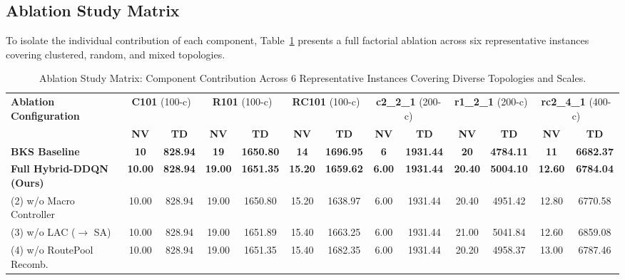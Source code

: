 \documentclass{ieeeaccess}
\begin{document}
\subsection{Ablation Study Matrix}
\label{sec:ablation_results}

To isolate the individual contribution of each component, Table~\ref{tab:ablation_matrix} presents a full factorial ablation across six representative instances covering clustered, random, and mixed topologies.

\begin{table}[!t]
\caption{Ablation Study Matrix: Component Contribution Across 6 Representative Instances Covering Diverse Topologies and Scales.}
\label{tab:ablation_matrix}
\centering
\footnotesize
\setlength{\tabcolsep}{2.5pt}
\begin{tabular*}{\textwidth}{@{\extracolsep{\fill}} l cc cc cc cc cc cc @{}}
\toprule
\multirow{2}{*}{\textbf{Ablation Configuration}} & \multicolumn{2}{c}{\textbf{C101} (100-c)} & \multicolumn{2}{c}{\textbf{R101} (100-c)} & \multicolumn{2}{c}{\textbf{RC101} (100-c)} & \multicolumn{2}{c}{\textbf{c2\_2\_1} (200-c)} & \multicolumn{2}{c}{\textbf{r1\_2\_1} (200-c)} & \multicolumn{2}{c}{\textbf{rc2\_4\_1} (400-c)} \\
\cmidrule(lr){2-3} \cmidrule(lr){4-5} \cmidrule(lr){6-7} \cmidrule(lr){8-9} \cmidrule(lr){10-11} \cmidrule(lr){12-13}
 & \textbf{NV} & \textbf{TD} & \textbf{NV} & \textbf{TD} & \textbf{NV} & \textbf{TD} & \textbf{NV} & \textbf{TD} & \textbf{NV} & \textbf{TD} & \textbf{NV} & \textbf{TD} \\
\midrule
\textbf{BKS Baseline} & \textbf{10} & \textbf{828.94} & \textbf{19} & \textbf{1650.80} & \textbf{14} & \textbf{1696.95} & \textbf{6} & \textbf{1931.44} & \textbf{20} & \textbf{4784.11} & \textbf{11} & \textbf{6682.37} \\
\midrule
\textbf{Full Hybrid-DDQN (Ours)} & \textbf{10.00} & \textbf{828.94} & \textbf{19.00} & \textbf{1651.35} & \textbf{15.20} & \textbf{1659.62} & \textbf{6.00} & \textbf{1931.44} & \textbf{20.40} & \textbf{5004.10} & \textbf{12.60} & \textbf{6784.04} \\
(2) w/o Macro Controller & 10.00 & 828.94 & 19.00 & 1650.80 & 15.20 & 1638.97 & 6.00 & 1931.44 & 20.40 & 4951.42 & 12.80 & 6770.58 \\
(3) w/o LAC ($\to$ SA) & 10.00 & 828.94 & 19.00 & 1651.89 & 15.40 & 1663.25 & 6.00 & 1931.44 & 21.00 & 5041.84 & 12.60 & 6859.08 \\
(4) w/o RoutePool Recomb. & 10.00 & 828.94 & 19.00 & 1651.35 & 15.40 & 1682.35 & 6.00 & 1931.44 & 20.20 & 4958.37 & 13.00 & 6787.46 \\

\end{tabular*}
\end{table}
\end{document}
